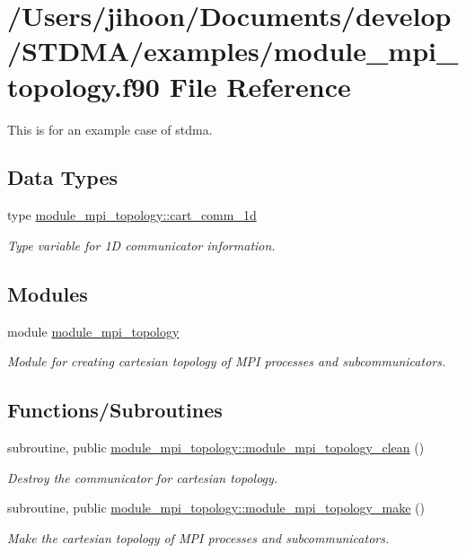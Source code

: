 \hypertarget{module__mpi__topology_8f90}{}\section{/\+Users/jihoon/\+Documents/develop/\+S\+T\+D\+M\+A/examples/module\+\_\+mpi\+\_\+topology.f90 File Reference}
\label{module__mpi__topology_8f90}


This is for an example case of stdma.  


\subsection*{Data Types}
\begin{DoxyCompactItemize}
\item 
type \mbox{\hyperlink{structmodule__mpi__topology_1_1cart__comm__1d}{module\+\_\+mpi\+\_\+topology\+::cart\+\_\+comm\+\_\+1d}}
\begin{DoxyCompactList}\small\item\em Type variable for 1D communicator information. \end{DoxyCompactList}\end{DoxyCompactItemize}
\subsection*{Modules}
\begin{DoxyCompactItemize}
\item 
module \mbox{\hyperlink{namespacemodule__mpi__topology}{module\+\_\+mpi\+\_\+topology}}
\begin{DoxyCompactList}\small\item\em Module for creating cartesian topology of M\+PI processes and subcommunicators. \end{DoxyCompactList}\end{DoxyCompactItemize}
\subsection*{Functions/\+Subroutines}
\begin{DoxyCompactItemize}
\item 
subroutine, public \mbox{\hyperlink{namespacemodule__mpi__topology_aba41ff8d55ee4cd7371e7165ed1a3316}{module\+\_\+mpi\+\_\+topology\+::module\+\_\+mpi\+\_\+topology\+\_\+clean}} ()
\begin{DoxyCompactList}\small\item\em Destroy the communicator for cartesian topology. \end{DoxyCompactList}\item 
subroutine, public \mbox{\hyperlink{namespacemodule__mpi__topology_a162ac095bb487254991dd12ad5ac8935}{module\+\_\+mpi\+\_\+topology\+::module\+\_\+mpi\+\_\+topology\+\_\+make}} ()
\begin{DoxyCompactList}\small\item\em Make the cartesian topology of M\+PI processes and subcommunicators. \end{DoxyCompactList}\end{DoxyCompactItemize}
